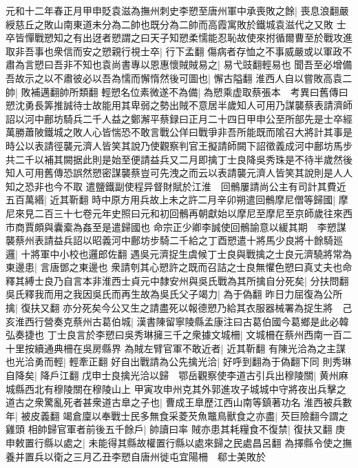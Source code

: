 元和十二年春正月甲申貶袁滋為撫州刺史李愬至唐州軍中承喪敗之餘|{
	喪息浪翻嚴綬慈丘之敗山南東道未分為二帥也既分為二帥而高霞寓敗於鐵城袁滋代之又敗}
士卒皆憚戰愬知之有出迓者愬謂之曰天子知愬柔懦能忍恥故使來拊循爾曹至於戰攻進取非吾事也衆信而安之愬親行視士卒|{
	行下孟翻}
傷病者存恤之不事威嚴或以軍政不肅為言愬曰吾非不知也袁尚書專以恩惠懷賊賊易之|{
	易弋豉翻輕易也}
聞吾至必增備吾故示之以不肅彼必以吾為懦而懈惰然後可圖也|{
	懈古隘翻}
淮西人自以嘗敗高袁二帥|{
	敗補邁翻帥所類翻}
輕愬名位素微遂不為備|{
	為愬乘虚取蔡張本　考異曰舊傳曰愬沈勇長筭推誠待士故能用其卑弱之勢出賊不意居半歲知人可用乃謀襲蔡表請濟師詔以河中鄜坊騎兵二千人益之鄭澥平蔡録曰正月二十四日甲申公至所部先是士卒經萬勝蕭陂鐵城之敗人心皆惴恐不敢言戰公佯曰戰爭非吾所能既而隂召大將計其事是時公以表請徑襲元濟人皆笑其說乃使觀察判官王擬請師闕下詔徵義成河中鄜坊馬步共二千以補其闕据此則是始至便請益兵又二月即擒丁士良降吳秀珠是不待半歲然後知人可用舊傳恐誤然愬密謀襲蔡豈可先洩之而云以表請襲元濟人皆笑其說則是人人知之恐非也今不取}
遣鹽鐵副使程异督財賦於江淮　回鶻屢請尚公主有司計其費近五百萬緡|{
	近其靳翻}
時中原方用兵故上未之許二月辛卯朔遣回鶻摩尼僧等歸國|{
	摩尼來見二百三十七卷元年史照曰元和初回鶻再朝獻始以摩尼至摩尼至京師歲往來西市商賈頗與囊槖為姦至是遣歸國也}
命宗正少卿李誠使回鶻諭意以緩其期　李愬謀襲蔡州表請益兵詔以昭義河中鄜坊步騎二千給之丁酉愬遣十將馬少良將十餘騎廵邏|{
	十將軍中小校也邏郎佐翻}
遇吳元濟捉生虞候丁士良與戰擒之士良元濟驍將常為東邊患|{
	言唐鄧之東邊也}
衆請刳其心愬許之既而召詰之士良無懼色愬曰真丈夫也命釋其縛士良乃自言本非淮西士貞元中隸安州與吳氏戰為其所擒自分死矣|{
	分扶問翻}
吳氏釋我而用之我因吳氏而再生故為吳氏父子竭力|{
	為于偽翻}
昨日力屈復為公所擒|{
	復扶又翻}
亦分死矣今公又生之請盡死以報德愬乃給其衣服器械署為捉生將　己亥淮西行營奏克蔡州古葛伯城|{
	漢書陳留寧陵縣孟康注曰古葛伯國今葛鄉是此必韓弘奏捷也}
丁士良言於李愬曰吳秀琳擁三千之衆據文城柵|{
	文城柵在蔡州西南一百二十里按續通典柵在吳房縣界}
為賊左臂官軍不敢近者|{
	近其靳翻}
有陳光洽為之主謀也光洽勇而輕|{
	輕牽正翻}
好自出戰請為公先擒光洽|{
	好呼到翻為于偽翻下同}
則秀琳自降矣|{
	降戶江翻}
戊申士良擒光洽以歸　鄂岳觀察使李道古引兵出穆陵關|{
	黄州麻城縣西北有穆陵關在穆陵山上}
甲寅攻申州克其外郭進攻子城城中守將夜出兵擊之道古之衆驚亂死者甚衆道古臯之子也|{
	曹成王臯歷江西山南等鎮著功名}
淮西被兵數年|{
	被皮義翻}
竭倉廩以奉戰士民多無食采菱芡魚鼈鳥獸食之亦盡|{
	芡巨險翻今謂之雞頭}
相帥歸官軍者前後五千餘戶|{
	帥讀曰率}
賊亦患其耗糧食不復禁|{
	復扶又翻}
庚申敕置行縣以處之|{
	未能得其縣故權置行縣以處來歸之民處昌呂翻}
為擇縣令使之撫養并置兵以衛之三月乙丑李愬自唐州徙屯宜陽柵　郗士美敗於

